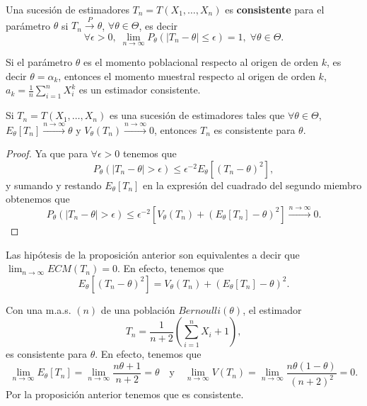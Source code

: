 \begin{definition}
	Una sucesión de estimadores $\displaystyle T_{n}=T\left(X_{1}, \ldots, X_{n}\right) $ es \textbf{consistente} para el parámetro $\displaystyle \theta $ si $\displaystyle T_{n}\xrightarrow{P}\theta $, $\displaystyle \forall\theta \in \Theta $, es decir
	\[\forall\epsilon > 0, \; \lim_{n \to \infty}P_{\theta}\left( \left|T_{n}-\theta\right|\leq \epsilon \right)=1, \; \forall \theta \in \Theta .\]
\end{definition}
\begin{eg}
Si el parámetro $\displaystyle \theta $ es el momento poblacional respecto al origen de orden $\displaystyle k $, es decir $\displaystyle \theta = \alpha_{k} $, entonces el momento muestral respecto al origen de orden $\displaystyle k $, $\displaystyle a_{k}=\frac{1}{n}\sum^{n}_{i = 1}X_{i}^{k} $ es un estimador consistente. 
\end{eg}
\begin{prop}
	Si $\displaystyle T_{n}=T\left(X_{1}, \ldots, X_{n}\right) $ es una sucesión de estimadores tales que $\displaystyle \forall \theta \in \Theta $, $\displaystyle E_{\theta}\left[T_{n}\right] \xrightarrow{n \to \infty}\theta $ y $\displaystyle V_{\theta}\left(T_{n}\right)\xrightarrow{n \to \infty} 0$, entonces $\displaystyle T_{n} $ es consistente para $\displaystyle \theta  $. 
\end{prop}
\begin{proof}
Ya que para $\displaystyle \forall \epsilon > 0 $ tenemos que 
\[P_{\theta}\left( \left|T_{n}-\theta\right| > \epsilon \right)\leq \epsilon ^{-2}E_{\theta}\left[\left(T_{n}-\theta\right)^{2}\right] ,\]
y sumando y restando $\displaystyle E_{\theta}\left[T_{n}\right]  $ en la expresión del cuadrado del segundo miembro obtenemos que 
\[P_{\theta}\left( \left|T_{n}-\theta\right|>\epsilon \right)\leq \epsilon ^{-2}\left[V_{\theta}\left(T_{n}\right)+\left(E_{\theta}\left[T_{n}\right] -\theta\right)^{2}\right]  \xrightarrow{n \to \infty} 0.\]
\end{proof}
\begin{observation}
Las hipótesis de la proposición anterior son equivalentes a decir que $\displaystyle \lim_{n \to \infty}ECM\left(T_{n}\right)=0 $. En efecto, tenemos que 
\[E_{\theta}\left[\left(T_{n}-\theta\right)^{2}\right] =V_{\theta}\left(T_{n}\right)+\left(E_{\theta}\left[T_{n}\right] -\theta\right)^{2} .\]
\end{observation}
\begin{eg}
Con una m.a.s. $\displaystyle \left(n\right) $ de una población $\displaystyle Bernoulli\left(\theta\right) $, el estimador
\[T_{n}=\frac{1}{n+2}\left(\sum^{n}_{i = 1}X_{i}+1\right) ,\]
es consistente para $\displaystyle \theta  $. En efecto, tenemos que 
\[\lim_{n \to \infty}E_{\theta}\left[T_{n}\right]=\lim_{n \to \infty}\frac{n\theta + 1}{n + 2}=\theta \quad \text{y} \quad \lim_{n \to \infty}V\left(T_{n}\right)=\lim_{n \to \infty}\frac{n\theta\left(1-\theta \right)}{\left(n+2\right)^{2}}=0  .\]
Por la proposición anterior tenemos que es consistente. 
\end{eg}
